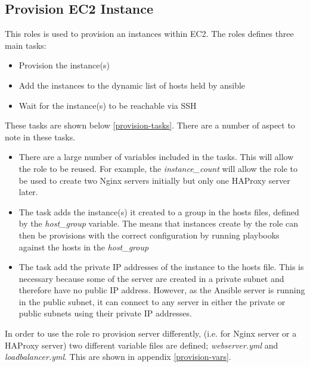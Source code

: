 \documentclass[a4paper]{article}
\begin{document}
    \subsection{Provision EC2 Instance}
    This roles is used to provision an instances within EC2. The roles defines three main tasks:
    \begin{itemize}
      \item Provision the instance(s)
      \item Add the instances to the dynamic list of hosts held by ansible
      \item Wait for the instance(s) to be reachable via SSH
    \end{itemize}
    These tasks are shown below \autoref{provision-tasks}. There are a number of aspect to note in these tasks.
    \begin{itemize}
      \item There are a large number of variables included in the tasks. This will allow the role to be reused. For example, the \textit{instance\_count} will allow the role to be used to create two Nginx servers initially but only one HAProxy server later.
      \item The task adds the instance(s) it created to a group in the hosts files, defined by the \textit{host\_group} variable. The means that instances create by the role can then be provisions with the correct configuration by running playbooks against the hosts in the \textit{host\_group}
      \item The task add the private IP addresses of the instance to the hosts file. This is necessary because some of the server are created in a private subnet and therefore have no public IP address. However, as the Ansible server is running in the public subnet, it can connect to any server in either the private or public subnets using their private IP addresses.
    \end{itemize}
    
    \noindent In order to use the role ro provision server differently, (i.e. for Nginx server or a HAProxy server) two different variable files are defined; \textit{webserver.yml} and \textit{loadbalancer.yml}. This are shown in appendix \ref{provision-vars}.
    
\end{document}
